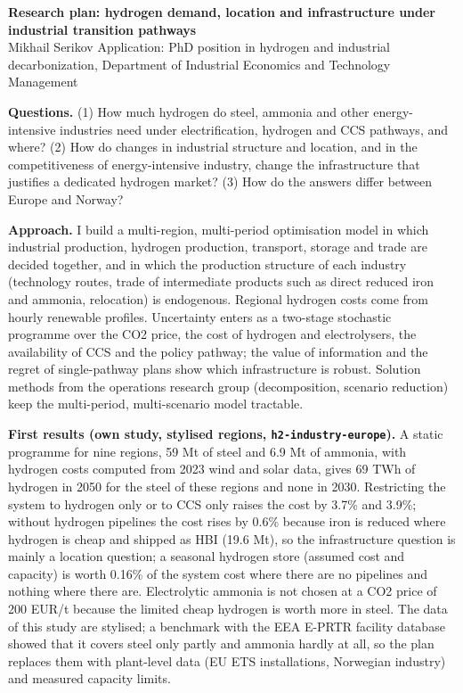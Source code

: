 \documentclass[10.5pt,a4paper]{article}
\begin{document}
{\Large\textbf{Research plan: hydrogen demand, location and infrastructure under industrial transition pathways}}\\[2pt]
Mikhail Serikov \hfill Application: PhD position in hydrogen and industrial decarbonization, Department of Industrial Economics and Technology Management

\textbf{Questions.} (1) How much hydrogen do steel, ammonia and other energy-intensive industries need under electrification, hydrogen and CCS pathways, and where? (2) How do changes in industrial structure and location, and in the competitiveness of energy-intensive industry, change the infrastructure that justifies a dedicated hydrogen market? (3) How do the answers differ between Europe and Norway?

\textbf{Approach.} I build a multi-region, multi-period optimisation model in which industrial production, hydrogen production, transport, storage and trade are decided together, and in which the production structure of each industry (technology routes, trade of intermediate products such as direct reduced iron and ammonia, relocation) is endogenous. Regional hydrogen costs come from hourly renewable profiles. Uncertainty enters as a two-stage stochastic programme over the CO2 price, the cost of hydrogen and electrolysers, the availability of CCS and the policy pathway; the value of information and the regret of single-pathway plans show which infrastructure is robust. Solution methods from the operations research group (decomposition, scenario reduction) keep the multi-period, multi-scenario model tractable.

\textbf{First results (own study, stylised regions, \texttt{h2-industry-europe}).} A static programme for nine regions, 59 Mt of steel and 6.9 Mt of ammonia, with hydrogen costs computed from 2023 wind and solar data, gives 69 TWh of hydrogen in 2050 for the steel of these regions and none in 2030. Restricting the system to hydrogen only or to CCS only raises the cost by 3.7\% and 3.9\%; without hydrogen pipelines the cost rises by 0.6\% because iron is reduced where hydrogen is cheap and shipped as HBI (19.6 Mt), so the infrastructure question is mainly a location question; a seasonal hydrogen store (assumed cost and capacity) is worth 0.16\% of the system cost where there are no pipelines and nothing where there are. Electrolytic ammonia is not chosen at a CO2 price of 200 EUR/t because the limited cheap hydrogen is worth more in steel. The data of this study are stylised; a benchmark with the EEA E-PRTR facility database showed that it covers steel only partly and ammonia hardly at all, so the plan replaces them with plant-level data (EU ETS installations, Norwegian industry) and measured capacity limits.
\end{document}
